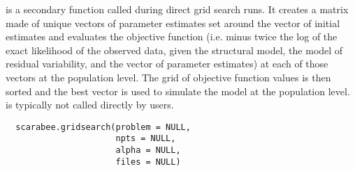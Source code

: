 %
\begin{Description}\relax
{} is a secondary function called during direct grid
search runs. It creates a matrix made of unique vectors of parameter 
estimates set around the vector of initial estimates and evaluates the 
objective function (i.e. minus twice the log of the exact likelihood of the 
observed data, given the structural model, the model of residual variability, 
and the vector of parameter estimates) at each of those vectors at the 
population level. The grid of objective function values is then sorted and the 
best vector is used to simulate the model at the population level. 
 is typically not called directly by users.
\end{Description}
%
\begin{Usage}
\begin{verbatim}
  scarabee.gridsearch(problem = NULL,
                      npts = NULL,
                      alpha = NULL,
                      files = NULL)
\end{verbatim}
\end{Usage}
%
